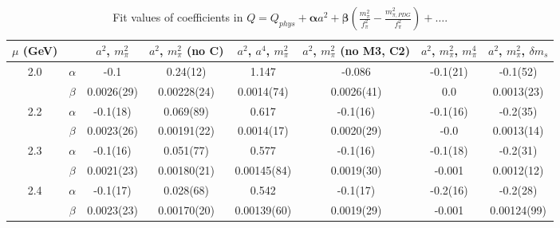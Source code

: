 \documentclass[12pt]{extarticle}
\begin{document}
\begin{table}[h!]
\begin{center}
\begin{tabular}{|c c|c|c|c|c|c|c|}
\hline
$\mu$ (GeV) &  & $a^2$, $m_\pi^2$& $a^2$, $m_\pi^2$ (no C)& $a^2$, $a^4$, $m_\pi^2$& $a^2$, $m_\pi^2$ (no M3, C2)& $a^2$, $m_\pi^2$, $m_\pi^4$& $a^2$, $m_\pi^2$, $\delta m_s$\\
\hline
\multirow{2}{0.5in}{2.0} & $\alpha$ & -0.1& 0.24(12)& 1.147& -0.086& -0.1(21)& -0.1(52)\\
 & $\beta$ & 0.0026(29)& 0.00228(24)& 0.0014(74)& 0.0026(41)& 0.0& 0.0013(23)\\
\hline
\multirow{2}{0.5in}{2.2} & $\alpha$ & -0.1(18)& 0.069(89)& 0.617& -0.1(16)& -0.1(16)& -0.2(35)\\
 & $\beta$ & 0.0023(26)& 0.00191(22)& 0.0014(17)& 0.0020(29)& -0.0& 0.0013(14)\\
\hline
\multirow{2}{0.5in}{2.3} & $\alpha$ & -0.1(16)& 0.051(77)& 0.577& -0.1(16)& -0.1(18)& -0.2(31)\\
 & $\beta$ & 0.0021(23)& 0.00180(21)& 0.00145(84)& 0.0019(30)& -0.001& 0.0012(12)\\
\hline
\multirow{2}{0.5in}{2.4} & $\alpha$ & -0.1(17)& 0.028(68)& 0.542& -0.1(17)& -0.2(16)& -0.2(28)\\
 & $\beta$ & 0.0023(23)& 0.00170(20)& 0.00139(60)& 0.0019(29)& -0.001& 0.00124(99)\\
\hline
\end{tabular}
\caption{Fit values of coefficients in $Q = Q_{phys} + \mathbf{\alpha} a^2 + \mathbf{\beta}\left(\frac{m_\pi^2}{f_\pi^2}-\frac{m_{\pi,PDG}^2}{f_\pi^2}\right) + \ldots$.}
\end{center}
\end{table}
























\clearpage
\end{document}
